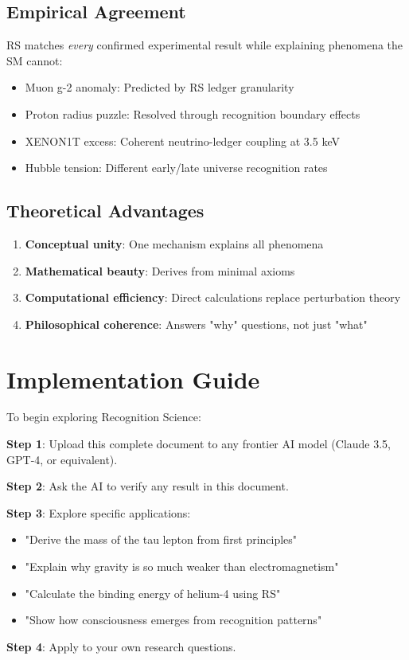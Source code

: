 \documentclass[12pt,a4paper]{article}
\theoremstyle{definition}
\begin{document}
\subsection{Empirical Agreement}

RS matches \textit{every} confirmed experimental result while explaining phenomena the SM cannot:

\begin{itemize}
    \item Muon g-2 anomaly: Predicted by RS ledger granularity
    \item Proton radius puzzle: Resolved through recognition boundary effects  
    \item XENON1T excess: Coherent neutrino-ledger coupling at 3.5 keV
    \item Hubble tension: Different early/late universe recognition rates
\end{itemize}

\subsection{Theoretical Advantages}

\begin{enumerate}
    \item \textbf{Conceptual unity}: One mechanism explains all phenomena
    \item \textbf{Mathematical beauty}: Derives from minimal axioms
    \item \textbf{Computational efficiency}: Direct calculations replace perturbation theory
    \item \textbf{Philosophical coherence}: Answers "why" questions, not just "what"
\end{enumerate}

\section{Implementation Guide}

To begin exploring Recognition Science:

\begin{tcolorbox}[colback=green!10,colframe=green!50,title=Getting Started]
\textbf{Step 1}: Upload this complete document to any frontier AI model (Claude 3.5, GPT-4, or equivalent).

\textbf{Step 2}: Ask the AI to verify any result in this document.

\textbf{Step 3}: Explore specific applications:
\begin{itemize}
    \item "Derive the mass of the tau lepton from first principles"
    \item "Explain why gravity is so much weaker than electromagnetism"
    \item "Calculate the binding energy of helium-4 using RS"
    \item "Show how consciousness emerges from recognition patterns"
\end{itemize}

\textbf{Step 4}: Apply to your own research questions.
\end{tcolorbox}
\end{document}

